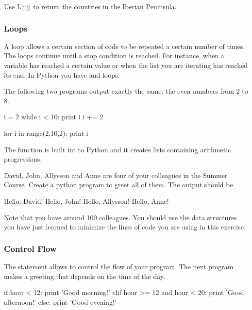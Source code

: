 \begin{exercise}
 Use L[i:j] to return the countries in the Iberian Peninsula.
\end{exercise}

\subsubsection{Loops}

A loop allows a certain section of code to be repeated a certain number of
times. The loops continue until a stop condition is reached. For instance, when
a variable has reached a certain value or when the list you are iterating has
reached its end. In Python you have  and  loops.

The following two programs output exactly the same: the even numbers from 2 to
8.


\begin{python}
i = 2
while i < 10:
  print i  
  i += 2 
\end{python}

\begin{python}
for i in range(2,10,2):
    print i
\end{python}

The  function is built int to Python and it creates lists
containing arithmetic progressions. 

\begin{exercise}
David, John, Allysson and Anne are four of your colleagues in the Summer Course. Create a python program to greet all of them. The output should be\\
\begin{python} 
Hello, David!
Hello, John!
Hello, Allysson!
Hello, Anne!
\end{python}
Note that you have around 100 colleagues. You should use the data structures you have just learned to minimize the lines of code you are using in this exercise.
\end{exercise}


\subsubsection{Control Flow}

The  statement allows to control the flow of your program. The next
program makes a greeting that depends on the time of the day.

\begin{python}
if hour < 12:
    print 'Good morning!'
elif hour >= 12 and hour < 20:
    print 'Good afternoon!'
else:
    print 'Good evening!'
\end{python}

